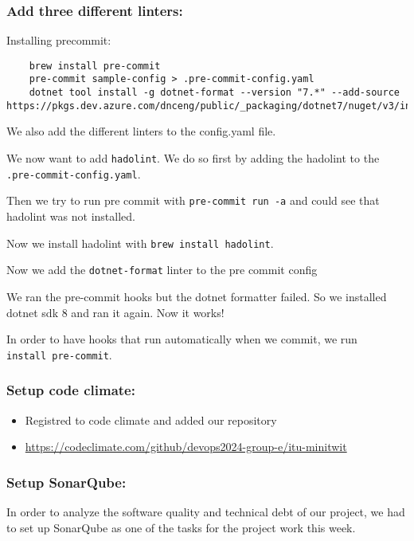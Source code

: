 \subsubsection{Add three different linters:}
\label{log:add-three-different-linters}

Installing precommit:
\begin{verbatim}
    brew install pre-commit
    pre-commit sample-config > .pre-commit-config.yaml
    dotnet tool install -g dotnet-format --version "7.*" --add-source https://pkgs.dev.azure.com/dnceng/public/_packaging/dotnet7/nuget/v3/index.json
\end{verbatim}

We also add the different linters to the config.yaml file.

We now want to add \texttt{hadolint}. We do so first by adding the
hadolint to the \texttt{.pre-commit-config.yaml}.

Then we try to run pre commit with \texttt{pre-commit\ run\ -a} and
could see that hadolint was not installed.

Now we install hadolint with \texttt{brew\ install\ hadolint}.

Now we add the \texttt{dotnet-format} linter to the pre commit config

We ran the pre-commit hooks but the dotnet formatter failed. So we
installed dotnet sdk 8 and ran it again. Now it works!

In order to have hooks that run automatically when we commit, we run
\texttt{install\ pre-commit}.

\subsubsection{Setup code climate:}
\label{log:setup-code-climate}

\begin{itemize}
    \item Registred to code climate and added our repository
    \item \url{https://codeclimate.com/github/devops2024-group-e/itu-minitwit}
\end{itemize}

\subsubsection{Setup SonarQube:}
\label{log:setup-sonarqube}

In order to analyze the software quality and technical debt of our project, we had to set up SonarQube as one of the tasks for the project work this week.

